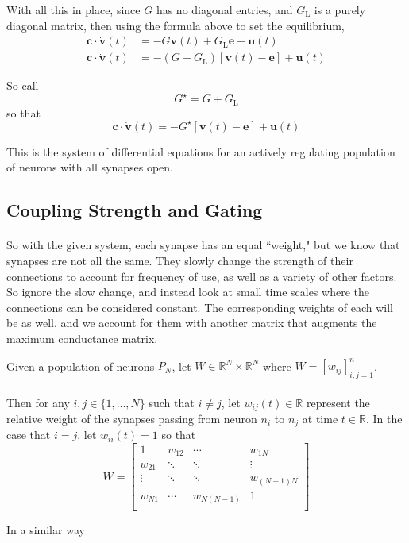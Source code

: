 \documentclass{article}
\begin{document}
With all this in place, since $G$ has no diagonal entries, and $G_{\text{L}}$ is a purely diagonal matrix, then using the formula above to set the equilibrium,
\begin{align*}
\mathbf{c}\cdot\dot{\mathbf{v}}(t) &=  -G \mathbf{v}(t) + G_{\text{L}} \mathbf{e} + \mathbf{u}(t) \\
\mathbf{c}\cdot\dot{\mathbf{v}}(t) &= -\left( G + G_{\text{L}} \right) \left[ \mathbf{v}(t) - \mathbf{e} \right] + \mathbf{u}(t)
\end{align*}

So call 
\[ \boxed{ G^{\star} = G + G_{\text{L}} } \]
so that 
\[ \boxed{ \mathbf{c}\cdot\dot{\mathbf{v}}(t) = -G^{\star} \left[ \mathbf{v}(t) - \mathbf{e} \right] + \mathbf{u}(t) } \]

This is the system of differential equations for an actively regulating population of neurons with all synapses open.

\subsection{Coupling Strength and Gating}

\paragraph{}
So with the given system, each synapse has an equal ``weight," but we know that synapses are not all the same. They slowly change the strength of their connections to account for frequency of use, as well as a variety of other factors. So ignore the slow change, and instead look at small time scales where the connections can be considered constant. The corresponding weights of each will be as well, and we account for them with another matrix that augments the maximum conductance matrix.

\begin{definition}[$W = \textbf{coupling strength matrix}$]\label{W}
Given a population of neurons $P_{N}$, let $W \in \mathbb{R}^{N} \times \mathbb{R}^{N}$ where $W = [w_{ij}]_{i,j=1}^{n}$. \\
\\
Then for any $i,j \in \{ 1, \dots, N \}$ such that $i \ne j$, let $w_{ij}(t) \in \mathbb{R}$ represent the relative weight of the synapses passing from neuron $n_{i}$ to $n_{j}$ at time $t\in\mathbb{R}$. In the case that $i=j$, let $w_{ii}(t)=1$ so that
\[ W =
\begin{bmatrix}
1	&	w_{12}	& \cdots & w_{1N} \\
w_{21}	& \ddots & \ddots & \vdots \\
\vdots	& \ddots & \ddots & w_{(N-1)N} \\
w_{N1}	& \cdots & w_{N(N-1)} & 1 \\
\end{bmatrix}\]
\end{definition}

In a similar way
\end{document}
